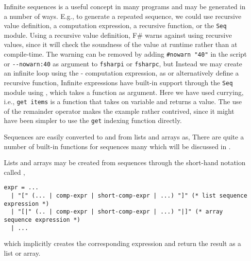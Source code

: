 \documentclass[fsharpNotes.tex]{subfiles}
\begin{document}
Infinite sequences is a useful concept in many programs and may be generated in a number of ways. E.g., to generate a repeated sequence, we could use recursive value definition, a computation expression, a recursive function, or the \lstinline!Seq! module. Using a recursive value definition,
%
%
F\# warns against using recursive values, since it will check the soundness of the value at runtime rather than at compile-time. The warning can be removed by adding \lstinline!#nowarn "40"! in the script or \lstinline!--nowarn:40! as argument to \lstinline[language=console]!fsharpi! or \lstinline[language=console]!fsharpc!, but  Instead we may create an infinite loop using the - computation expression, as
%
%
or alternatively define a recursive function,
%
%
Infinite expressions have built-in support through the \lstinline!Seq! module using ,
%
%
which takes a function as argument. Here we have used currying, i.e., \lstinline!get items! is a function that takes on variable and returns a value. The use of the remainder operator makes the example rather contrived, since it might have been simpler to use the \lstinline!get! indexing function directly.

Sequences are easily converted to and from lists and arrays as,
%
%
There are quite a number of built-in functions for sequences many which will be discussed in .
 
Lists and arrays may be created from sequences through the short-hand notation called ,
\begin{lstlisting}[language=ebnf]
expr = ... 
  | "[" (... | comp-expr | short-comp-expr | ...) "]" (* list sequence expression *)
  | "[|" (.. | comp-expr | short-comp-expr | ...) "|]" (* array sequence expression *)
  | ...
\end{lstlisting}
which implicitly creates the corresponding expression and return the result as a list or array.
\end{document}
